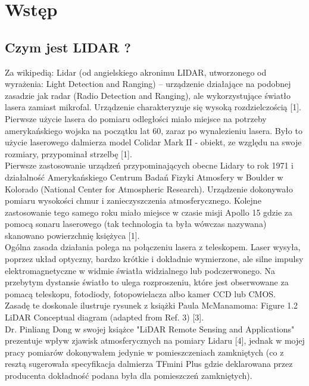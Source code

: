 \section {Wstęp}

\subsection {Czym jest LIDAR ?}

Za wikipedią:
Lidar (od angielskiego akronimu LIDAR, utworzonego od wyrażenia: Light Detection and Ranging)
– urządzenie działające na podobnej zasadzie jak radar (Radio Detection and Ranging), ale
wykorzystujące światło lasera zamiast mikrofal. Urządzenie charakteryzuje się wysoką
rozdzielczością [1].\\

Pierwsze użycie lasera do pomiaru odległości miało miejsce na potrzeby amerykańskiego 
wojska na początku lat 60, zaraz po wynalezieniu lasera. Było to użycie laserowego dalmierza 
model Colidar Mark II - obiekt, ze względu na swoje rozmiary, przypominał strzelbę [1].\\

Pierwsze zastosowanie urządzeń przypominających obecne Lidary to rok 1971 i działalność
Amerykańskiego Centrum Badań Fizyki Atmosfery w Boulder w Kolorado (National Center for
Atmospheric Research). Urządzenie dokonywało pomiaru wysokości chmur i zanieczyszczenia
atmosferycznego. Kolejne zastosowanie tego samego roku miało miejsce w czasie misji
Apollo 15 gdzie za pomocą sonaru laserowego (tak technologia ta była wówczas nazywana)
skanowano powierzchnię księżyca [1].\\

Ogólna zasada działania polega na połączeniu lasera z teleskopem. Laser wysyła, poprzez 
układ optyczny, bardzo krótkie i dokładnie wymierzone, ale silne impulsy elektromagnetyczne
w widmie światła widzialnego lub podczerwonego. Na przebytym dystansie światło to ulega
rozproszeniu, które jest obserwowane za pomacą teleskopu, fotodiody, fotopowielacza albo
kamer CCD lub CMOS. \\

Zasadę te doskonale ilustruje rysunek z książki Paula McManamoma:
Figure 1.2 LiDAR Conceptual diagram (adapted from Ref. 3) [3].\\

Dr. Pinliang Dong w swojej książce "LiDAR Remote Sensing and Applications" prezentuje 
wpływ zjawisk atmosferycznych na pomiary Lidaru [4], jednak w mojej pracy pomiarów dokonywałem
jedynie w pomieszczeniach zamkniętych (co z resztą sugerowała specyfikacja dalmierza TFmini
Plus gdzie deklarowana przez producenta dokładność podana była dla pomieszczeń zamkniętych).\\